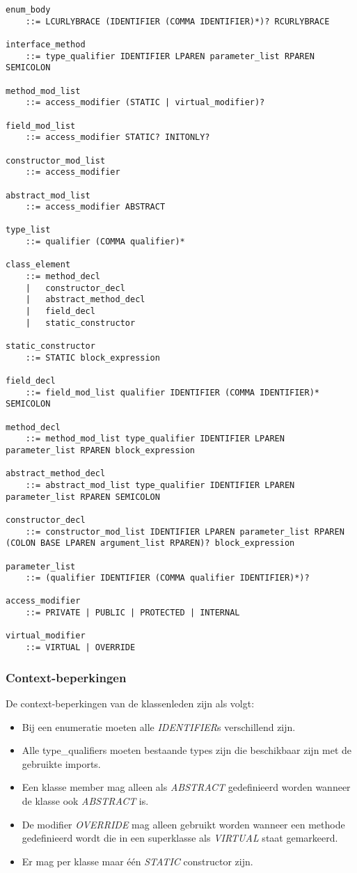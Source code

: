 \begin{lstlisting}
enum_body
	::=	LCURLYBRACE (IDENTIFIER (COMMA IDENTIFIER)*)? RCURLYBRACE

interface_method
	::=	type_qualifier IDENTIFIER LPAREN parameter_list RPAREN SEMICOLON

method_mod_list
	::=	access_modifier (STATIC | virtual_modifier)?

field_mod_list
	::=	access_modifier STATIC? INITONLY?

constructor_mod_list
	::=	access_modifier

abstract_mod_list
	::=	access_modifier ABSTRACT

type_list
	::=	qualifier (COMMA qualifier)*

class_element
	::=	method_decl
	|	constructor_decl
	|	abstract_method_decl
	|	field_decl
	|	static_constructor

static_constructor
	::=	STATIC block_expression

field_decl
	::=	field_mod_list qualifier IDENTIFIER (COMMA IDENTIFIER)* SEMICOLON

method_decl
	::=	method_mod_list type_qualifier IDENTIFIER LPAREN parameter_list RPAREN block_expression

abstract_method_decl
	::=	abstract_mod_list type_qualifier IDENTIFIER LPAREN parameter_list RPAREN SEMICOLON

constructor_decl
	::=	constructor_mod_list IDENTIFIER LPAREN parameter_list RPAREN (COLON BASE LPAREN argument_list RPAREN)? block_expression

parameter_list
	::=	(qualifier IDENTIFIER (COMMA qualifier IDENTIFIER)*)?

access_modifier
	::=	PRIVATE | PUBLIC | PROTECTED | INTERNAL

virtual_modifier
	::=	VIRTUAL | OVERRIDE
\end{lstlisting}

\subsubsection{Context-beperkingen}
De context-beperkingen van de klassenleden zijn als volgt:

\begin{itemize}
	\item Bij een enumeratie moeten alle \textit{IDENTIFIER}s verschillend zijn.
	\item Alle type\_qualifiers moeten bestaande types zijn die beschikbaar zijn met de gebruikte imports.
	\item Een klasse member mag alleen als \textit{ABSTRACT} gedefinieerd worden wanneer de klasse ook \textit{ABSTRACT} is.
	\item De modifier \textit{OVERRIDE} mag alleen gebruikt worden wanneer een methode gedefinieerd wordt die in een superklasse als \textit{VIRTUAL} staat gemarkeerd.
	\item Er mag per klasse maar \'e\'en \textit{STATIC} constructor zijn.
\end{itemize}

